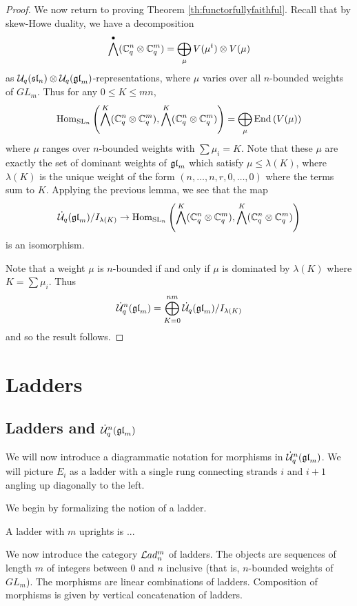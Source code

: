 \documentclass[10pt,leqno]{article}
\begin{document}
\begin{proof}
We now return to proving Theorem \ref{th:functorfullyfaithful}. Recall that by skew-Howe duality, we have a decomposition
$$ \bigwedge^\bullet ({\mathbb{C}}_q^n \otimes {\mathbb{C}}_q^m) = \bigoplus_{\mu} V(\mu^t) \otimes V(\mu) $$
as $\mathcal{U}_q({\mathfrak{sl}}_n) \otimes \mathcal{U}_q({\mathfrak{gl}}_m)$-representations, where $\mu$ varies over all $n$-bounded weights of $ GL_m$. Thus for any $ 0 \le K \le mn $,
$$ \operatorname{Hom}_{{\rm{SL}}_n} \left(\bigwedge^K({\mathbb{C}}_q^n \otimes {\mathbb{C}}_q^m), \bigwedge^K({\mathbb{C}}_q^n \otimes {\mathbb{C}}_q^m)\right) = \bigoplus_{\mu} \operatorname{End}\left(V(\mu)\right) $$
where $ \mu $ ranges over $ n$-bounded weights with $ \sum \mu_i = K $.  Note that these $\mu $ are exactly the set of dominant weights of $ {\mathfrak{gl}}_m $ which satisfy $ \mu \le \lambda(K) $, where $ \lambda(K) $ is the unique weight of the form $(n, \dots, n, r, 0, \dots, 0) $ where the terms sum to $K$.  Applying the previous lemma, we see that the map
$$ \dot{{\mathcal{U}}}_q({\mathfrak{gl}}_m)/I_{\lambda(K)} \rightarrow \operatorname{Hom}_{{\rm{SL}}_n} \left(\bigwedge^K({\mathbb{C}}_q^n \otimes {\mathbb{C}}_q^m), \bigwedge^K({\mathbb{C}}_q^n \otimes {\mathbb{C}}_q^m)\right) $$
is an isomorphism.

Note that a weight $ \mu $ is $n$-bounded if and only if $ \mu $ is dominated by $ \lambda(K) $ where $ K = \sum \mu_i $. Thus
$$
\dot{{\mathcal{U}}}_q^n({\mathfrak{gl}}_m) = \bigoplus_{K=0}^{nm} \dot{{\mathcal{U}}}_q({\mathfrak{gl}}_m)/I_{\lambda(K)}
$$
and so the result follows.
\end{proof}

\section{Ladders}
\label{sec:ladders}

\subsection{Ladders and $\dot{{\mathcal{U}}}_q^n({\mathfrak{gl}}_m)$ }
We will now introduce a diagrammatic notation for morphisms in $ \dot{{\mathcal{U}}}_q^n({\mathfrak{gl}}_m)$.  We will picture $E_i $ as a ladder with a single rung connecting strands $ i $ and $ i+1 $ angling up diagonally to the left.

We begin by formalizing the notion of a ladder.
\begin{defn}
A ladder with $ m $ uprights is ...
\end{defn}

We now introduce the category  $ \mathcal{L}ad_n^m $ of ladders. The objects are sequences of length $m$ of integers between $0$ and $n$ inclusive (that is, $n$-bounded weights of $GL_m$). The morphisms are linear combinations of ladders.  Composition of morphisms is given by vertical concatenation of ladders.
\end{document}
